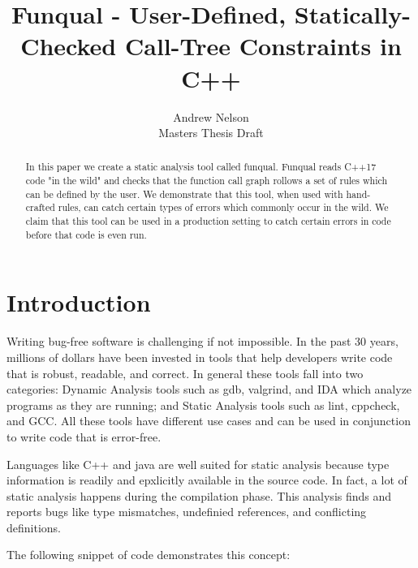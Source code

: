 \documentclass{article}
\begin{document}
  \begin{titlepage}
    \title{Funqual - User-Defined, Statically-Checked Call-Tree Constraints in C++}

    \author{Andrew Nelson\\Masters Thesis Draft}

    \maketitle

    \begin{abstract}
      In this paper we create a static analysis tool called funqual.  Funqual reads C++17 code "in the wild" and checks that the function call graph rollows a set of rules which can be defined by the user.  We demonstrate that this tool, when used with hand-crafted rules, can catch certain types of errors which commonly occur in the wild.  We claim that this tool can be used in a production setting to catch certain errors in code before that code is even run.  
    \end{abstract}
  \end{titlepage}

  \newpage
  \tableofcontents
  \newpage

  \onecolumn


  \section{Introduction}

  Writing bug-free software is challenging if not impossible.  In the past 30 years, millions of dollars have been invested in tools that help developers write code that is robust, readable, and correct.  In general these tools fall into two categories:  Dynamic Analysis tools such as gdb, valgrind, and IDA which analyze programs as they are running; and Static Analysis tools such as lint, cppcheck, and GCC.  All these tools have different use cases and can be used in conjunction to write code that is error-free.

  Languages like C++ and java are well suited for static analysis because type information is readily and epxlicitly available in the source code.  In fact, a lot of static analysis happens during the compilation phase.  This analysis finds and reports bugs like type mismatches, undefinied references, and conflicting definitions.  

  The following snippet of code demonstrates this concept:
\end{document}
